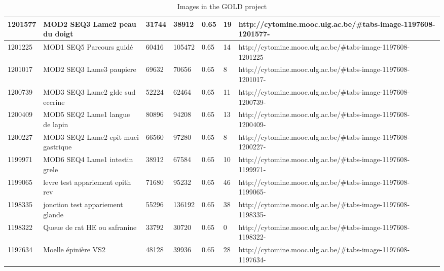 \documentclass[a4paper,11pt]{report}
\numberwithin{figure}{chapter} %
\begin{document}
\begin{table}[]
{\begin{tabular}{|l|l|l|l|l|l|l|}
1201577  & MOD2 SEQ3 Lame2 peau du doigt                                                                & 31744  & 38912  & 0.65                  & 19          & http://cytomine.mooc.ulg.ac.be/\#tabs-image-1197608-1201577-  \\ \hline
1201225  & MOD1 SEQ5 Parcours guid\'{e}                                                                     & 60416  & 105472 & 0.65                  & 14          & http://cytomine.mooc.ulg.ac.be/\#tabs-image-1197608-1201225-  \\ \hline
1201017  & MOD2 SEQ3 Lame3 paupiere                                                                     & 69632  & 70656  & 0.65                  & 8           & http://cytomine.mooc.ulg.ac.be/\#tabs-image-1197608-1201017-  \\ \hline
1200739  & MOD3 SEQ3 Lame2 glde sud eccrine                                                             & 52224  & 62464  & 0.65                  & 11          & http://cytomine.mooc.ulg.ac.be/\#tabs-image-1197608-1200739-  \\ \hline
1200409  & MOD5 SEQ2 Lame1 langue de lapin                                                              & 80896  & 94208  & 0.65                  & 13          & http://cytomine.mooc.ulg.ac.be/\#tabs-image-1197608-1200409-  \\ \hline
1200227  & MOD3 SEQ2 Lame2 epit muci gastrique                                                          & 66560  & 97280  & 0.65                  & 8           & http://cytomine.mooc.ulg.ac.be/\#tabs-image-1197608-1200227-  \\ \hline
1199971  & MOD6 SEQ4 Lame1 intestin grele                                                               & 38912  & 67584  & 0.65                  & 10          & http://cytomine.mooc.ulg.ac.be/\#tabs-image-1197608-1199971-  \\ \hline
1199065  & levre test appariement epith rev                                                             & 71680  & 95232  & 0.65                  & 46          & http://cytomine.mooc.ulg.ac.be/\#tabs-image-1197608-1199065-  \\ \hline
1198335  & jonction test appariement glande                                                             & 55296  & 136192 & 0.65                  & 38          & http://cytomine.mooc.ulg.ac.be/\#tabs-image-1197608-1198335-  \\ \hline
1198322  & Queue de rat HE ou safranine                                                                 & 33792  & 30720  & 0.65                  & 0           & http://cytomine.mooc.ulg.ac.be/\#tabs-image-1197608-1198322-  \\ \hline
1197634  & Moelle \'{e}pini\`{e}re VS2                                                                          & 48128  & 39936  & 0.65                  & 28          & http://cytomine.mooc.ulg.ac.be/\#tabs-image-1197608-1197634-  \\ \hline
\end{tabular}}

\caption{Images in the GOLD project}
\end{table}
\end{document}
